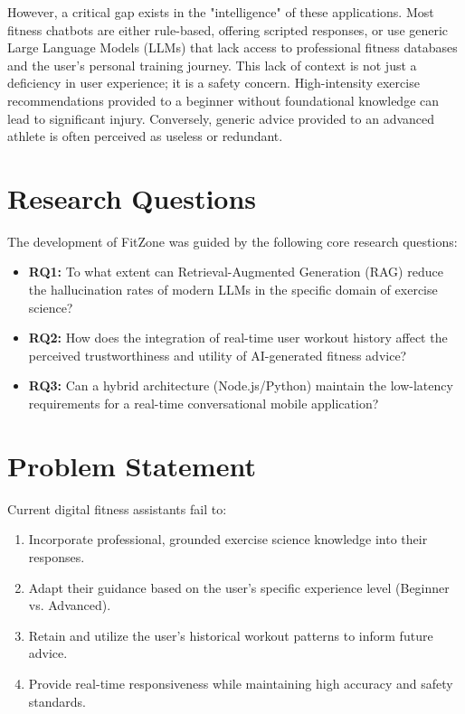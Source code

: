 \documentclass[12pt,a4paper]{report}
\begin{document}
However, a critical gap exists in the "intelligence" of these applications. Most fitness chatbots are either rule-based, offering scripted responses, or use generic Large Language Models (LLMs) that lack access to professional fitness databases and the user's personal training journey. This lack of context is not just a deficiency in user experience; it is a safety concern. High-intensity exercise recommendations provided to a beginner without foundational knowledge can lead to significant injury. Conversely, generic advice provided to an advanced athlete is often perceived as useless or redundant.

\section{Research Questions}
The development of FitZone was guided by the following core research questions:
\begin{itemize}
    \item \textbf{RQ1:} To what extent can Retrieval-Augmented Generation (RAG) reduce the hallucination rates of modern LLMs in the specific domain of exercise science?
    \item \textbf{RQ2:} How does the integration of real-time user workout history affect the perceived trustworthiness and utility of AI-generated fitness advice?
    \item \textbf{RQ3:} Can a hybrid architecture (Node.js/Python) maintain the low-latency requirements for a real-time conversational mobile application?
\end{itemize}

\section{Problem Statement}
Current digital fitness assistants fail to:
\begin{enumerate}
    \item Incorporate professional, grounded exercise science knowledge into their responses.
    \item Adapt their guidance based on the user's specific experience level (Beginner vs. Advanced).
    \item Retain and utilize the user's historical workout patterns to inform future advice.
    \item Provide real-time responsiveness while maintaining high accuracy and safety standards.
\end{enumerate}
\end{document}
